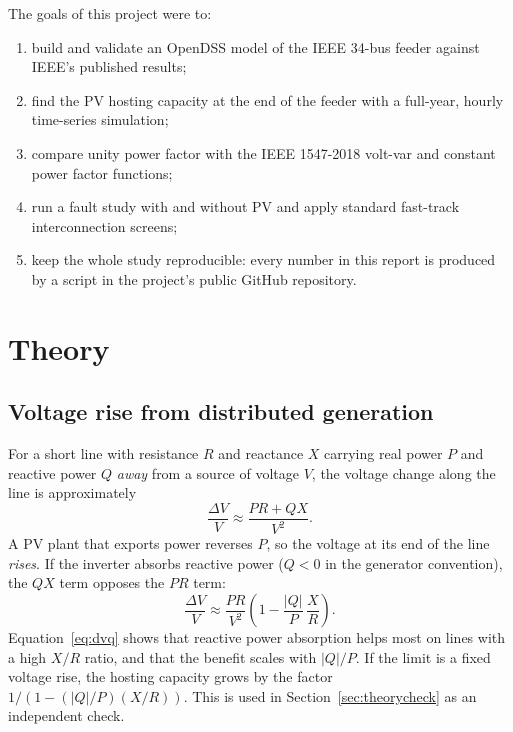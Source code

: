 \documentclass[11pt,letterpaper]{article}
\begin{document}
The goals of this project were to:
\begin{enumerate}
  \item build and validate an OpenDSS model of the IEEE 34-bus feeder against IEEE's published results;
  \item find the PV hosting capacity at the end of the feeder with a full-year, hourly time-series simulation;
  \item compare unity power factor with the IEEE 1547-2018 volt-var and constant power factor functions;
  \item run a fault study with and without PV and apply standard fast-track interconnection screens;
  \item keep the whole study reproducible: every number in this report is produced by a script in the
        project's public GitHub repository.
\end{enumerate}

\section{Theory}

\subsection{Voltage rise from distributed generation}
For a short line with resistance $R$ and reactance $X$ carrying real power $P$ and reactive power $Q$
\emph{away} from a source of voltage $V$, the voltage change along the line is approximately
\begin{equation}
  \frac{\Delta V}{V} \approx \frac{P R + Q X}{V^2}.
  \label{eq:dv}
\end{equation}
A PV plant that exports power reverses $P$, so the voltage at its end of the line \emph{rises}. If the
inverter absorbs reactive power ($Q<0$ in the generator convention), the $QX$ term opposes the $PR$ term:
\begin{equation}
  \frac{\Delta V}{V} \approx \frac{P R}{V^2}\left(1 - \frac{|Q|}{P}\,\frac{X}{R}\right).
  \label{eq:dvq}
\end{equation}
Equation~\eqref{eq:dvq} shows that reactive power absorption helps most on lines with a high $X/R$ ratio,
and that the benefit scales with $|Q|/P$. If the limit is a fixed voltage rise, the hosting capacity grows by
the factor $1/(1-(|Q|/P)(X/R))$. This is used in Section~\ref{sec:theorycheck} as an independent check.
\end{document}
